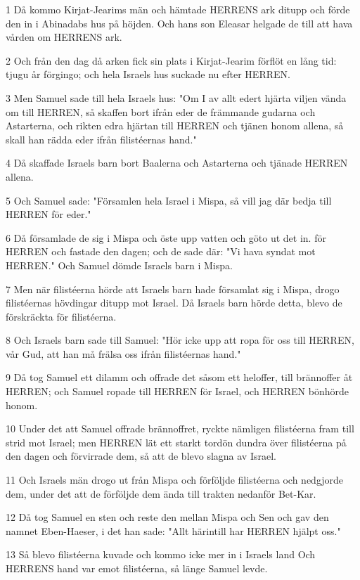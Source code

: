 \par 1 Då kommo Kirjat-Jearims män och hämtade HERRENS ark ditupp och förde den in i Abinadabs hus på höjden. Och hans son Eleasar helgade de till att hava vården om HERRENS ark.
\par 2 Och från den dag då arken fick sin plats i Kirjat-Jearim förflöt en lång tid: tjugu år förgingo; och hela Israels hus suckade nu efter HERREN.
\par 3 Men Samuel sade till hela Israels hus: "Om I av allt edert hjärta viljen vända om till HERREN, så skaffen bort ifrån eder de främmande gudarna och Astarterna, och rikten edra hjärtan till HERREN och tjänen honom allena, så skall han rädda eder ifrån filistéernas hand."
\par 4 Då skaffade Israels barn bort Baalerna och Astarterna och tjänade HERREN allena.
\par 5 Och Samuel sade: "Församlen hela Israel i Mispa, så vill jag där bedja till HERREN för eder."
\par 6 Då församlade de sig i Mispa och öste upp vatten och göto ut det in. för HERREN och fastade den dagen; och de sade där: "Vi hava syndat mot HERREN." Och Samuel dömde Israels barn i Mispa.
\par 7 Men när filistéerna hörde att Israels barn hade församlat sig i Mispa, drogo filistéernas hövdingar ditupp mot Israel. Då Israels barn hörde detta, blevo de förskräckta för filistéerna.
\par 8 Och Israels barn sade till Samuel: "Hör icke upp att ropa för oss till HERREN, vår Gud, att han må frälsa oss ifrån filistéernas hand."
\par 9 Då tog Samuel ett dilamm och offrade det såsom ett heloffer, till brännoffer åt HERREN; och Samuel ropade till HERREN för Israel, och HERREN bönhörde honom.
\par 10 Under det att Samuel offrade brännoffret, ryckte nämligen filistéerna fram till strid mot Israel; men HERREN lät ett starkt tordön dundra över filistéerna på den dagen och förvirrade dem, så att de blevo slagna av Israel.
\par 11 Och Israels män drogo ut från Mispa och förföljde filistéerna och nedgjorde dem, under det att de förföljde dem ända till trakten nedanför Bet-Kar.
\par 12 Då tog Samuel en sten och reste den mellan Mispa och Sen och gav den namnet Eben-Haeser, i det han sade: "Allt härintill har HERREN hjälpt oss."
\par 13 Så blevo filistéerna kuvade och kommo icke mer in i Israels land Och HERRENS hand var emot filistéerna, så länge Samuel levde.
